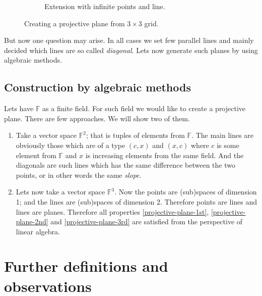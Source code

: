 \begin{figure}[!h]
\begin{subfigure}{0.4\textwidth}
		\caption{Extension with infinite points and line.}
	\end{subfigure}
	\caption{Creating a projective plane from $3 \times 3$ grid.}
	\label{3by3}
\end{figure}

But now one question may arise. In all cases we set few parallel lines and mainly decided which lines are so called \textit{diagonal}. Lets now generate such planes by using algebraic methods.

\subsection{Construction by algebraic methods}

Lets have $\mathbb{F}$ as a finite field. For such field we would like to create a projective plane. There are few approaches. We will show two of them.

\begin{enumerate}
	\item Take a vector space $\mathbb{F}^2$; that is tuples of elements from $\mathbb{F}$. The main lines are obviously those which are of a type $(c,x)$ and $(x,c)$ where $c$ is some element from $\mathbb{F}$ and $x$ is increasing elements from the same field. And the diagonals are such lines which has the same difference between the two points, or in other words the same \textit{slope}.
	
	\item Lets now take a vector space $\mathbb{F}^3$. Now the points are (sub)spaces of dimension 1; and the lines are (sub)spaces of dimension 2. Therefore points are lines and lines are planes. Therefore all properties \ref{projective-plane-1st}, \ref{projective-plane-2nd} and \ref{projective-plane-3rd} are satisfied from the perspective of linear algebra.
\end{enumerate}

\section{Further definitions and observations}

